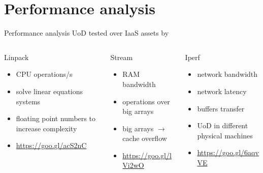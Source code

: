 %
%
\section{Performance analysis}
\begin{frame}{Performance analysis}
	UoD tested over IaaS assets by
	\begin{columns}
		\begin{column}[t]{0.33\textwidth}
			\begin{center}
				Linpack
			\end{center}
			\begin{itemize}
				\item{\tiny{CPU operations/s}}
				\item{\tiny{solve linear equations systems}}
				\item{\tiny{floating point numbers to increase complexity}}
				\item{\tiny{\url{https://goo.gl/acS2nC}}}
			\end{itemize}
		\end{column}
		\begin{column}[t]{0.33\textwidth}
			\begin{center}
				Stream
			\end{center}
			\begin{itemize}
				\item{\tiny{RAM bandwidth}}
				\item{\tiny{operations over big arrays}}
				\item{\tiny{big arrays $\rightarrow{}$ cache overflow}}
				\item{\tiny{\url{https://goo.gl/lVi2wO}}}
			\end{itemize}
		\end{column}
		\begin{column}[t]{0.33\textwidth}
			\begin{center}
				Iperf
			\end{center}
			\begin{itemize}
				\item{\tiny{network bandwidth}}
				\item{\tiny{network latency}}
				\item{\tiny{buffers transfer}}
				\item{\tiny{UoD in different physical machines}}
				\item{\tiny{\url{https://goo.gl/6aqvVE}}}
			\end{itemize}
		\end{column}
	\end{columns}
\end{frame}


